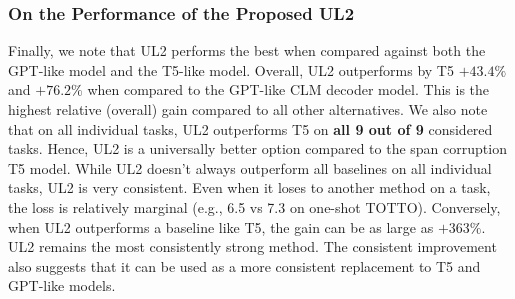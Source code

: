 \documentclass[10pt]{article}
\begin{document}
\subsubsection{On the Performance of the Proposed UL2}
Finally, we note that UL2 performs the best when compared against both the GPT-like model and the T5-like model. Overall, UL2 outperforms by T5 $+43.4\%$ and $+76.2\%$ when compared to the GPT-like CLM decoder model. This is the highest relative (overall) gain compared to all other alternatives. We also note that on all individual tasks, UL2 outperforms T5 on \textbf{all 9 out of 9} considered tasks. Hence, UL2 is a universally better option compared to the span corruption T5 model. While UL2 doesn't always outperform all baselines on all individual tasks, UL2 is very consistent. Even when it loses to another method on a task, the loss is relatively marginal (e.g., 6.5 vs 7.3 on one-shot TOTTO). Conversely, when UL2 outperforms a baseline like T5, the gain can be as large as $+363\%$. UL2 remains the most consistently strong method. The consistent improvement also suggests that it can be used as a more consistent replacement to T5 and GPT-like models.
\end{document}
